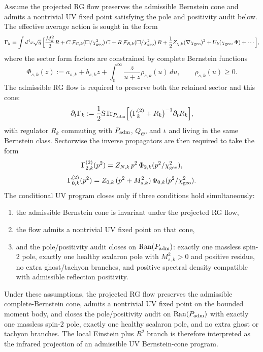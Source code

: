 
\begin{theorem}
\label{thm:uv-bernstein-cone-completion}
Assume the projected RG flow preserves the admissible Bernstein cone and admits a nontrivial UV
fixed point satisfying the pole and positivity audit below. The effective average action is
sought in the form
\[
\Gamma_k
=
\int d^4x\sqrt g\,
\Bigl[
\frac{M_k^2}{2}R
+C\,\mathcal F_{C,k}(\Box/\chi_{\mathrm{geo}}^2)\,C
+R\,\mathcal F_{R,k}(\Box/\chi_{\mathrm{geo}}^2)\,R
+\frac12 Z_{\chi,k}(\nabla\chi_{\mathrm{geo}})^2
+U_k(\chi_{\mathrm{geo}},\Phi)
+\cdots
\Bigr],
\]
where the sector form factors are constrained by complete Bernstein functions
\[
\Phi_{s,k}(z)
:=
a_{s,k}+b_{s,k}z+\int_0^\infty \frac{z}{u+z}\rho_{s,k}(u)\,du,
\qquad
\rho_{s,k}(u)\ge 0.
\]
The admissible RG flow is required to preserve both the retained sector and this
cone:
\[
\partial_t\Gamma_k
:=
\frac12\mathrm{STr}_{P_{\mathrm{adm}}}
\Bigl[
\bigl(\Gamma_k^{(2)}+R_k\bigr)^{-1}\partial_t R_k
\Bigr],
\]
with regulator $R_k$ commuting with $P_{\mathrm{adm}}$, $Q_\Theta$, and $\iota$ and living in
the same Bernstein class. Sectorwise the inverse propagators are then required to
take the form
\[
\Gamma^{(2)}_{2,k}(p^2)
=
Z_{N,k}\,p^2\,\Phi_{2,k}(p^2/\chi_{\mathrm{geo}}^2),
\]
\[
\Gamma^{(2)}_{0,k}(p^2)
=
Z_{0,k}\,(p^2+M_{s,k}^2)\,\Phi_{0,k}(p^2/\chi_{\mathrm{geo}}^2).
\]
The conditional UV program closes only if three conditions hold simultaneously:
\begin{enumerate}[label=(\roman*), leftmargin=1.5em, topsep=3pt, itemsep=2pt]
    \item the admissible Bernstein cone is invariant under the projected RG flow,
    \item the flow admits a nontrivial UV fixed point on that cone,
    \item and the pole/positivity audit closes on $\operatorname{Ran}(P_{\mathrm{adm}})$:
    exactly one massless spin-$2$ pole, exactly one healthy scalaron pole with
    $M_{s,k}^2>0$ and positive residue, no extra ghost/tachyon branches, and
    positive spectral density compatible with admissible reflection positivity.
\end{enumerate}
Under these assumptions, the projected RG flow preserves the admissible complete-Bernstein cone,
admits a nontrivial UV fixed point on the bounded moment body, and closes the pole/positivity
audit on $\operatorname{Ran}(P_{\mathrm{adm}})$ with exactly one massless spin-$2$ pole, exactly one
healthy scalaron pole, and no extra ghost or tachyon branches. The local Einstein plus $R^2$
branch is therefore interpreted as the infrared projection of an admissible UV Bernstein-cone
program.
\end{theorem}

